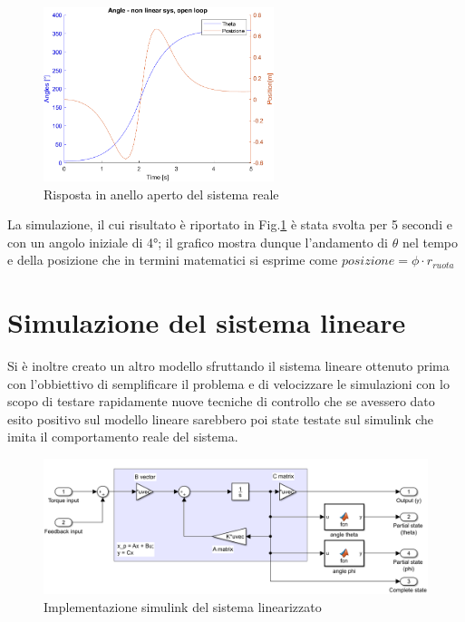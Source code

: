 \begin{figure}[H]
	\centering   	
	\includegraphics[width=0.6\textwidth]{Immagini/open_loop_response_non_linear.png}
	\caption{Risposta in anello aperto del sistema reale}
	\label{fig:open_loop_response_non_linear}
\end{figure}
La simulazione, il cui risultato è riportato in Fig.\ref{fig:open_loop_response_non_linear} è stata svolta per 5 secondi e con un angolo iniziale di 4°; il grafico mostra dunque l'andamento di $\theta$ nel tempo e della posizione che in termini matematici si esprime come $posizione = \phi \cdot{r_{ruota}}$
\label{sec:simulazione_reale}
\section{Simulazione del sistema lineare}
Si è inoltre creato un altro modello sfruttando il sistema lineare ottenuto prima  con l'obbiettivo di semplificare il problema e di velocizzare le simulazioni con lo scopo di testare rapidamente nuove tecniche di controllo che se avessero dato esito positivo sul modello lineare sarebbero poi state testate sul simulink che imita il comportamento reale del sistema.
\begin{figure}[H]
	\centering   	
	\includegraphics[width=1\textwidth]{Immagini/linear_system.png}
	\caption{Implementazione simulink del sistema linearizzato}
	\label{fig:linear_system}
\end{figure}

